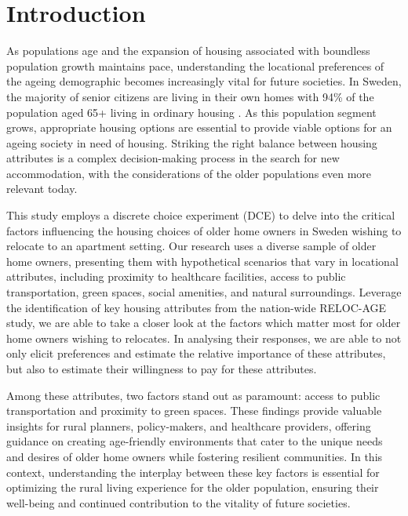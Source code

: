 \documentclass[3p,12pt ]{elsarticle}
\begin{document}
\section{Introduction}

As populations age and the expansion of housing associated with boundless population growth maintains pace,
understanding the locational preferences of the ageing demographic becomes increasingly vital for future societies.
In Sweden, the majority of senior citizens are living in their own homes with 94\% of the population aged 65+ living in ordinary housing \citep{jennbertDevelopmentsElderlyPolicy2009}.
As this population segment grows,
appropriate housing options are essential to provide viable options for an ageing society in need of housing.
Striking the right balance between housing attributes is a complex decision-making process in the search for new accommodation,
with the considerations of the older populations even more relevant today.

This study employs a discrete choice experiment (DCE) to delve into the critical factors influencing the housing choices of older home owners in Sweden wishing to relocate to an apartment setting. Our research uses a diverse sample of older home owners, presenting them with hypothetical scenarios that vary in locational attributes, including proximity to healthcare facilities, access to public transportation, green spaces, social amenities, and natural surroundings.
Leverage the identification of key housing attributes from the nation-wide RELOC-AGE study,
we are able to take a closer look at the factors which matter most for older home owners wishing to relocates.
In analysing their responses, we are able to not only elicit preferences and estimate the relative importance of these attributes,
but also to estimate their willingness to pay for these attributes.

Among these attributes, two factors stand out as paramount: access to public transportation and proximity to green spaces.
These findings provide valuable insights for rural planners, policy-makers, and healthcare providers, offering guidance on creating age-friendly environments that cater to the unique needs and desires of older home owners while fostering resilient communities.
In this context, understanding the interplay between these key factors is essential for optimizing the rural living experience for the older population, ensuring their well-being and continued contribution to the vitality of future societies.
\end{document}
